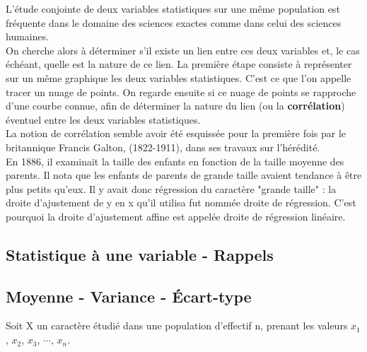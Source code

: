 


  
 
 L'étude conjointe de deux variables statistiques sur une même population est fréquente dans le domaine des sciences exactes comme dans celui des sciences humaines. \\On cherche alors à déterminer s'il existe un lien entre ces deux variables et, le cas échéant, quelle est la nature de ce lien.
La première étape consiste à représenter sur un même graphique les deux variables statistiques. C'est ce que l'on appelle tracer un nuage de points. On regarde ensuite si ce nuage de points se rapproche d'une courbe connue, afin de déterminer la nature du lien (ou la \textbf{corrélation}) éventuel entre les deux variables statistiques.\\
La notion de corrélation semble avoir été esquissée pour la première fois par  le britannique  Francis Galton, (1822-1911), dans ses travaux sur l'hérédité.\\
En 1886, il examinait la taille des enfants en fonction de la taille moyenne des parents. Il nota que les enfants de parents de grande taille
avaient tendance à être plus petits qu'eux. Il y avait donc régression du
caractère "grande taille" :  la droite d'ajustement de y en x qu'il utilisa fut nommée droite de régression. C'est pourquoi   la droite d'ajustement affine est  appelée  droite de régression linéaire.\\

\subsection{Statistique à une variable - Rappels}
\subsection*{Moyenne - Variance - Écart-type}
Soit X un caractère étudié dans une population d'effectif n,\; prenant les valeurs $ x_{1} $ ,  $ x_{2} $,   $ x_{3}$, $ \cdots $, $x_{n}$.\\


